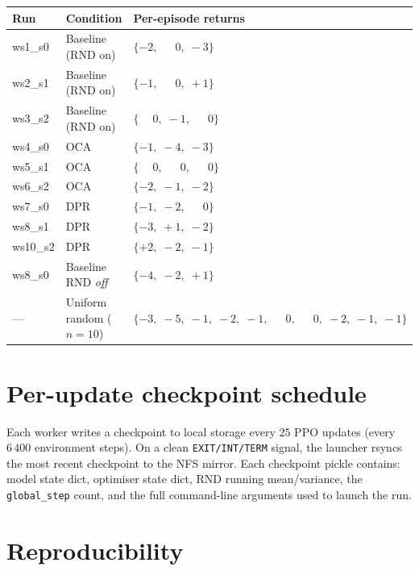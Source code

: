 \documentclass{article}
\begin{document}
\begin{table}[h]
  \centering
  \small
  \begin{tabular}{lll}
    \toprule
    \textbf{Run} & \textbf{Condition} & \textbf{Per-episode returns} \\
    \midrule
    ws1\_s0  & Baseline (RND on)              & $\{-2,\;\phantom{-}0,\;-3\}$ \\
    ws2\_s1  & Baseline (RND on)              & $\{-1,\;\phantom{-}0,\;+1\}$ \\
    ws3\_s2  & Baseline (RND on)              & $\{\phantom{-}0,\;-1,\;\phantom{-}0\}$ \\
    ws4\_s0  & OCA                            & $\{-1,\;-4,\;-3\}$ \\
    ws5\_s1  & OCA                            & $\{\phantom{-}0,\;\phantom{-}0,\;\phantom{-}0\}$ \\
    ws6\_s2  & OCA                            & $\{-2,\;-1,\;-2\}$ \\
    ws7\_s0  & DPR                            & $\{-1,\;-2,\;\phantom{-}0\}$ \\
    ws8\_s1  & DPR                            & $\{-3,\;+1,\;-2\}$ \\
    ws10\_s2 & DPR                            & $\{+2,\;-2,\;-1\}$ \\
    \midrule
    ws8\_s0  & Baseline RND \emph{off}        & $\{-4,\;-2,\;+1\}$ \\
    ---      & Uniform random ($n{=}10$)      & $\{-3,\;-5,\;-1,\;-2,\;-1,\;\phantom{-}0,\;\phantom{-}0,\;-2,\;-1,\;-1\}$ \\
    \bottomrule
  \end{tabular}
\end{table}

\section{Per-update checkpoint schedule}
\label{app:ckpt}

Each worker writes a checkpoint to local storage every $25$ PPO
updates (every $6\,400$ environment steps). On a clean
\texttt{EXIT/INT/TERM} signal, the launcher rsyncs the most
recent checkpoint to the NFS mirror. Each checkpoint pickle
contains: model state dict, optimiser state dict, RND running
mean/variance, the \texttt{global\_step} count, and the full
command-line arguments used to launch the run.

\section{Reproducibility}
\label{app:repro}
\end{document}
